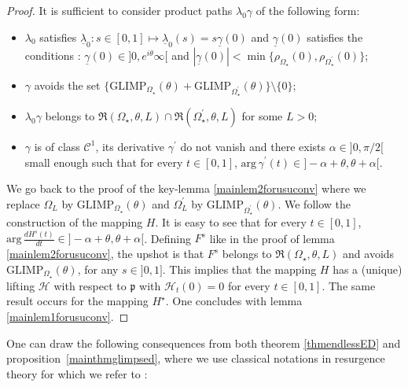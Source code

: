 \documentclass[11pt, english]{smfart}
\theoremstyle{definition}
\begin{document}
\begin{proof}
It is sufficient to consider product paths $\lambda_0 \gamma$ of the
following form:
\begin{itemize}
\item  $\lambda_0$ satisfies $\underline{\lambda}_0 : s \in [0,1] \mapsto
  \underline{\lambda}_0 (s)=s\underline{\gamma} (0)$ and
  $\underline{\gamma}(0)$ satisfies the conditions :
  $\underline{\gamma}(0) \in  ]0, e^{i\theta}\infty[$ and
$|\underline{\gamma}(0)| < \min \{\rho_{\Omega_\star}(0) , \rho_{\Omega_\star^\prime}(0)\}$;
\item $\gamma$  avoids the set 
$\{\mathrm{GLIMP}_{\Omega_\star}(\theta)+\mathrm{GLIMP}_{\Omega_\star^\prime}(\theta)\}
\setminus \{0\}$;
\item $\lambda_0 \gamma$ belongs to $\mathfrak{R}(\Omega_\star,
  \theta, L) \cap
  \mathfrak{R}(\Omega_\star^\prime ,\theta,L)$  for some $L>0$;
\item $\gamma$ is of class $\mathcal{C}^1$, its derivative
  $\gamma^\prime$ do not vanish and there exists $\alpha
  \in ]0,\pi/2[$ small enough such that for every $t \in [0,1]$,
$\mathrm{arg} \, \gamma^\prime(t) \in
  ]-\alpha+\theta, \theta +\alpha[$.
\end{itemize}
We go back to the proof of the key-lemma \ref{mainlem2forusuconv}
where we replace   $\Omega_L$ by
$\mathrm{GLIMP}_{\Omega_\star}(\theta)$ and $\Omega^\prime_L$ by
$\mathrm{GLIMP}_{\Omega_\star^\prime}(\theta)$. We follow the
construction of  the
mapping $H$. It is easy to see that
for every $t \in [0,1]$, $\displaystyle \mathrm{arg} \,\frac{d
  H^s(t)}{dt} \in  ]-\alpha+\theta, \theta +\alpha[$. Defining $F^s$
like in the proof of lemma \ref{mainlem2forusuconv}, the upshot is
that  $F^s$ belongs to $\mathfrak{R}(\Omega_\star,
  \theta, L)$ and avoids $\mathrm{GLIMP}_{\Omega_\star}(\theta)$, for
  any $s \in ]0,1]$. This implies that the mapping $H$ has a (unique)
  lifting $\mathcal{H}$ with respect to $\mathfrak{p}$ with
  $\mathcal{H}_t(0)=0$ for every $t \in [0,1]$. The same result occurs for the mapping
  $H^\star$. One concludes with lemma \ref{mainlem1forusuconv}.
\end{proof}

One can draw the following consequences from 
both theorem \ref{thmendlessED} and
proposition~\ref{mainthmglimpsed}, where we use classical notations in
resurgence theory for which we refer to \cite{S014, Del014} :
\end{document}
